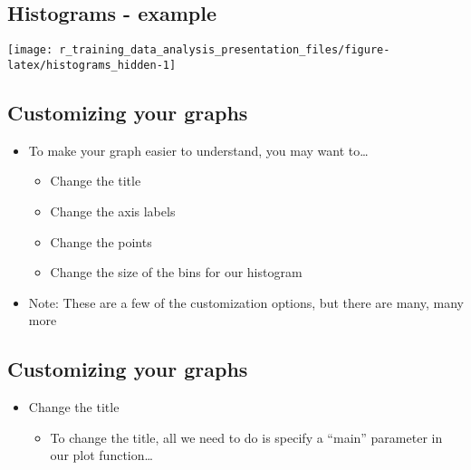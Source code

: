 \documentclass[]{article}
\newenvironment{Shaded}{\begin{snugshade}}{\end{snugshade}}
\newcommand{\KeywordTok}[1]{\textcolor[rgb]{0.13,0.29,0.53}{\textbf{#1}}}
\newcommand{\OperatorTok}[1]{\textcolor[rgb]{0.81,0.36,0.00}{\textbf{#1}}}
\newcommand{\NormalTok}[1]{#1}
\providecommand{\tightlist}{%
  \setlength{\itemsep}{0pt}\setlength{\parskip}{0pt}}
\begin{document}
\begin{Shaded}
\end{Shaded}

\subsection{Histograms - example}\label{histograms---example-1}

\begin{center}\texttt{[image: r\_training\_data\_analysis\_presentation\_files/figure-latex/histograms\_hidden-1]} \end{center}

\subsection{Customizing your graphs}\label{customizing-your-graphs}

\begin{itemize}
\tightlist
\item
  To make your graph easier to understand, you may want to\ldots{}

  \begin{itemize}
  \tightlist
  \item
    Change the title
  \item
    Change the axis labels
  \item
    Change the points
  \item
    Change the size of the bins for our histogram
  \end{itemize}
\item
  Note: These are a few of the customization options, but there are
  many, many more
\end{itemize}

\subsection{Customizing your graphs}\label{customizing-your-graphs-1}

\begin{itemize}
\tightlist
\item
  Change the title

  \begin{itemize}
  \tightlist
  \item
    To change the title, all we need to do is specify a ``main''
    parameter in our plot function\ldots{}
  \end{itemize}
\end{itemize}
\end{document}
